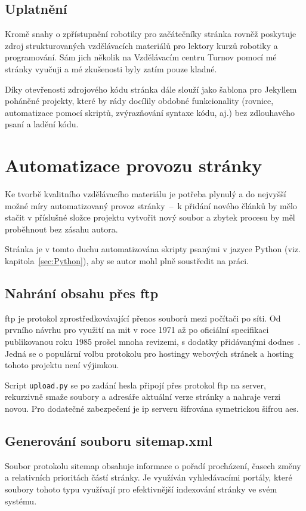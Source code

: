 \documentclass[a4paper, 12pt]{article}
\begin{document}
  \subsection{Uplatnění}
  Kromě snahy o zpřístupnění robotiky pro začátečníky stránka rovněž poskytuje zdroj strukturovaných vzdělávacích materiálů pro lektory kurzů robotiky a programování. Sám jich několik na Vzdělávacím centru Turnov pomocí mé stránky vyučuji a mé zkušenosti byly zatím pouze kladné.

  Díky otevřenosti zdrojového kódu stránka dále slouží jako šablona pro Jekyllem poháněné projekty, které by rády docílily obdobné funkcionality (rovnice, automatizace pomocí skriptů, zvýrazňování syntaxe kódu, aj.) bez zdlouhavého psaní a ladění kódu.


  \section{Automatizace provozu stránky} \label{sec:Automatizace provozu stránky}
  Ke tvorbě kvalitního vzdělávacího materiálu je potřeba plynulý a do nejvyšší možné míry automatizovaný provoz stránky~--~k přidání nového článků by mělo stačit v příslušné složce projektu vytvořit nový soubor a zbytek procesu by měl proběhnout bez zásahu autora.

  Stránka je v tomto duchu automatizována skripty psanými v jazyce Python (viz. kapitola~\ref{sec:Python}), aby se autor mohl plně soustředit na práci.


  \subsection{Nahrání obsahu přes \acrshort{ftp}}
  \gls{ftp} je protokol zprostředkovávající přenos souborů mezi počítači po síti. Od prvního návrhu pro využití na \gls{mit} v roce 1971 až po oficiální specifikaci publikovanou roku 1985 prošel mnoha revizemi, s dodatky přidávanými dodnes~\cite{ftp-specification}. Jedná se o populární volbu protokolu pro hostingy webových stránek a hosting tohoto projektu není výjimkou.

  Script \texttt{upload.py} se po zadání hesla připojí přes protokol \gls{ftp} na server, rekurzivně smaže soubory a adresáře aktuální verze stránky a nahraje verzi novou. Pro dodatečné zabezpečení je \gls{ip} serveru šifrována symetrickou šifrou \gls{aes}.


  \subsection{Generování souboru sitemap.xml}
  Soubor protokolu sitemap obsahuje informace o pořadí procházení, časech změny a relativních prioritách částí stránky. Je využíván vyhledávacími portály, které soubory tohoto typu využívají pro efektivnější indexování stránky ve svém systému.
\end{document}
